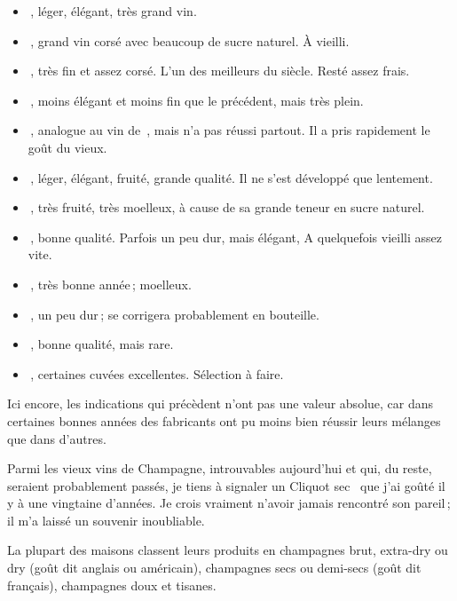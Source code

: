 \medskip
\begin{itemize}
\scriptsize
\item[ ]{\mmm} {\mmm}, léger, élégant, très grand vin.
\item[ ]{\mmm} {\mmm}, grand vin corsé avec beaucoup de sucre naturel. À vieilli.
\item[ ]{\mmm} {\mmm}, très fin et assez corsé. L'un des meilleurs du siècle. Resté assez frais.
\item[ ]{\mmm} {\mmm}, moins élégant et moins fin que le précédent, mais très plein.
\item[ ]{\mmm} {\mmm}, analogue au vin de {\mmm} {\mmm}, mais n'a pas réussi partout. Il a pris rapidement le goût du vieux.
\item[ ]{\mmm} {\mmm}, léger, élégant, fruité, grande qualité. Il ne s'est développé que lentement.
\item[ ]{\mmm} {\mmm}, très fruité, très moelleux, à cause de sa grande teneur en sucre naturel.
\item[ ]{\mmm} {\mmm}, bonne qualité. Parfois un peu dur, mais élégant, A quelquefois vieilli assez vite.
\item[ ]{\mmm} {\mmm}, très bonne année ; moelleux.
\item[ ]{\mmm} {\mmm}, un peu dur ; se corrigera probablement en bouteille.
\item[ ]{\mmm} {\mmm}, bonne qualité, mais rare.
\item[ ]{\mmm} {\mmm}, certaines cuvées excellentes. Sélection à faire.
\end{itemize}

\medskip

Ici encore, les indications qui précèdent n'ont pas une valeur absolue, car
dans certaines bonnes années des fabricants ont pu moins bien réussir leurs
mélanges que dans d’autres.

Parmi les vieux vins de Champagne, introuvables aujourd'hui et qui, du reste,
seraient probablement passés, je tiens à signaler un Cliquot sec
{\mmm} {\mmm} que j'ai goûté il y à une vingtaine d'années. Je
crois vraiment n'avoir jamais rencontré son pareil ; il m'a laissé un souvenir
inoubliable.

La plupart des maisons classent leurs produits en champagnes brut, extra-dry ou
dry (goût dit anglais ou américain), champagnes secs ou demi-secs (goût dit
français), champagnes doux et tisanes.

